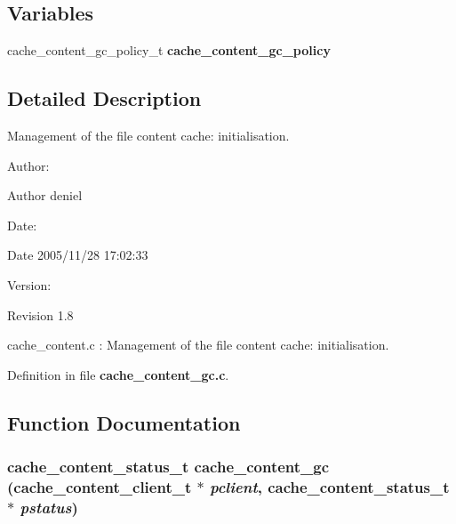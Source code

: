 \subsection*{Variables}
\begin{CompactItemize}
\item 
cache\_\-content\_\-gc\_\-policy\_\-t {\bf cache\_\-content\_\-gc\_\-policy}
\end{CompactItemize}


\subsection{Detailed Description}
Management of the file content cache: initialisation. 

\begin{Desc}
\item[Author:]\begin{Desc}
\item[Author]deniel \end{Desc}
\end{Desc}
\begin{Desc}
\item[Date:]\begin{Desc}
\item[Date]2005/11/28 17:02:33 \end{Desc}
\end{Desc}
\begin{Desc}
\item[Version:]\begin{Desc}
\item[Revision]1.8 \end{Desc}
\end{Desc}
cache\_\-content.c : Management of the file content cache: initialisation.

Definition in file {\bf cache\_\-content\_\-gc.c}.

\subsection{Function Documentation}
\subsubsection{\setlength{\rightskip}{0pt plus 5cm}cache\_\-content\_\-status\_\-t cache\_\-content\_\-gc (cache\_\-content\_\-client\_\-t $\ast$ {\em pclient}, cache\_\-content\_\-status\_\-t $\ast$ {\em pstatus})}\label{cache__content__gc_8c_a7}


